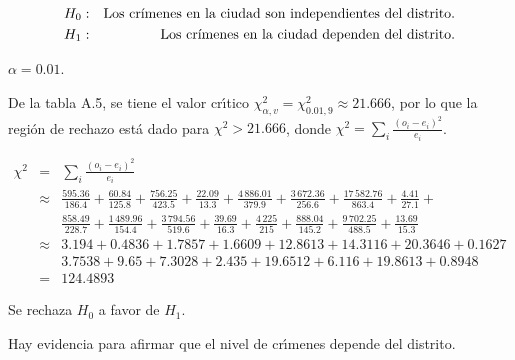 \begin{solucion}
 \begin{hipotesis}
  \begin{eqnarray*}
   H_0: & & \text{Los cr\'{\i}menes en la ciudad son independientes
   del distrito.} \\
   H_1: & & \text{Los cr\'{\i}menes en la ciudad dependen del distrito.}
  \end{eqnarray*}
 \end{hipotesis}

 \begin{significancia}
  $\alpha = 0.01$.
 \end{significancia}

 \begin{region}
  De la tabla A.5, se tiene el valor cr\'{\i}tico
  $\chi^2_{\alpha,v} = \chi^2_{0.01,9} \approx 21.666$,
  por lo que la regi\'on de rechazo est\'a dado
  para $\chi^2 > 21.666$, donde
  $\chi^2 = \sum_{i} \frac{\left( o_i - e_i \right)^2}{e_i}$.
 \end{region}

 \begin{estadistico}
  \begin{eqnarray*}
   \chi^2 & = & \sum_{i} \frac{\left( o_i - e_i \right)^2}{e_i} \\
   & \approx & \frac{595.36}{186.4} + \frac{60.84}{125.8} + 
   \frac{756.25}{423.5} + \frac{22.09}{13.3} + \frac{4\,886.01}{379.9} +
   \frac{3\,672.36}{256.6} + \frac{17\,582.76}{863.4} + \frac{4.41}{27.1} +\\
   & & \frac{858.49}{228.7} + \frac{1\,489.96}{154.4} +
   \frac{3\,794.56}{519.6} + \frac{39.69}{16.3} + \frac{4\,225}{215} +
   \frac{888.04}{145.2} + \frac{9\,702.25}{488.5} + \frac{13.69}{15.3} \\
   & \approx & 3.194 + 0.4836 + 1.7857 + 1.6609 + 12.8613 + 14.3116 +
   20.3646 + 0.1627 \\
   & & 3.7538 + 9.65 + 7.3028 + 2.435 + 19.6512 + 6.116 + 19.8613 + 0.8948 \\
   & = & 124.4893
  \end{eqnarray*}
 \end{estadistico}

 \begin{decision}
  Se rechaza $H_0$ a favor de $H_1$.
 \end{decision}

 \begin{conclusion}
  Hay evidencia para afirmar que el nivel de cr\'{\i}menes depende
  del distrito.
 \end{conclusion}


\end{solucion}
